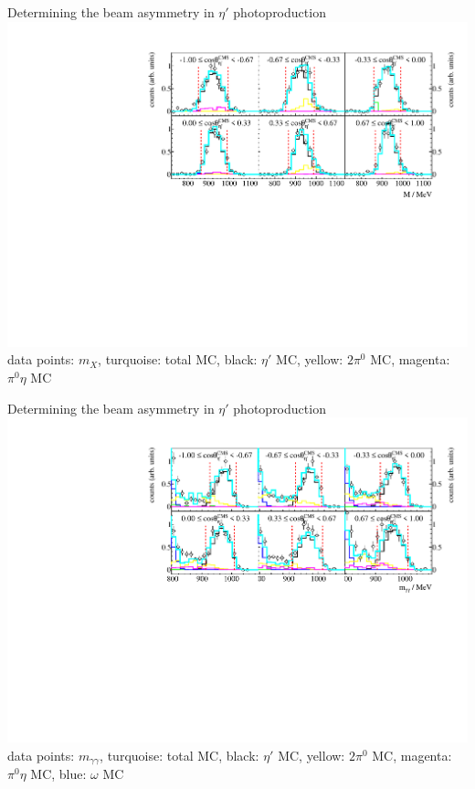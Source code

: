 \documentclass[11pt,aspectratio=169,dvipsnames]{beamer}
\begin{document}
\begin{frame}{Determining the beam asymmetry in $\eta'$ photoproduction}
	\vspace{-0.95cm}
	\includegraphics[width=.95\linewidth]{../../figs/hydrogen/bin_cuts/mismcut_ebin1.pdf}
	data points: $m_X$, turquoise: total MC, black: $\eta'$ MC, yellow: $2\pi^0$ MC, magenta: $\pi^0\eta$ MC
\end{frame}
\begin{frame}{Determining the beam asymmetry in $\eta'$ photoproduction}
	\vspace{-0.95cm}
	\includegraphics[width=.95\linewidth]{../../figs/hydrogen/bin_cuts/invcut_ebin1.pdf}
	data points: $m_{\gamma\gamma}$, turquoise: total MC, black: $\eta'$ MC, yellow: $2\pi^0$ MC, magenta: $\pi^0\eta$ MC, blue: $\omega$ MC
\end{frame}
\end{document}

